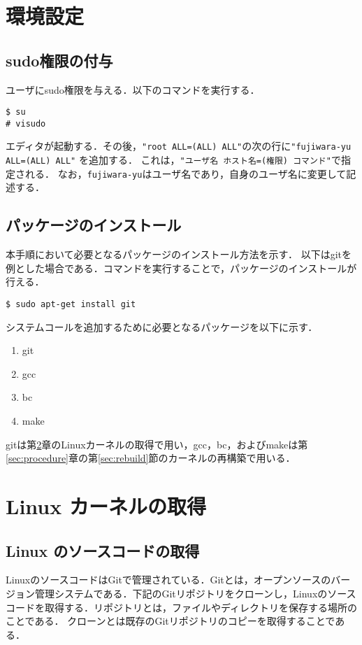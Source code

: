 \documentclass[12pt]{jsarticle}
\begin{document}
\section{環境設定}\label{sec:config}
\subsection{sudo権限の付与}
ユーザにsudo権限を与える．以下のコマンドを実行する．
\begin{verbatim}
$ su
# visudo
\end{verbatim}
エディタが起動する．その後，\verb|"root ALL=(ALL) ALL"|の次の行に\verb|"fujiwara-yu ALL=(ALL) ALL"| を追加する．
これは，\verb|"ユーザ名 ホスト名=(権限) コマンド"|で指定される．
なお，\verb|fujiwara-yu|はユーザ名であり，自身のユーザ名に変更して記述する．

\subsection{パッケージのインストール}
本手順において必要となるパッケージのインストール方法を示す．
以下はgitを例とした場合である．コマンドを実行することで，パッケージのインストールが行える．
\begin{verbatim}
$ sudo apt-get install git
\end{verbatim}
システムコールを追加するために必要となるパッケージを以下に示す．
\begin{enumerate}
\item git
\item gcc
\item bc
\item make
\end{enumerate}

gitは第\ref{sec:kernel}章のLinuxカーネルの取得で用い，gcc，bc，およびmakeは第\ref{sec:procedure}章の第\ref{sec:rebuild}節のカーネルの再構築で用いる．

\section{Linux カーネルの取得}\label{sec:kernel}
\subsection{Linux のソースコードの取得}
LinuxのソースコードはGitで管理されている．Gitとは，オープンソースのバージョン管理システムである．下記のGitリポジトリをクローンし，Linuxのソースコードを取得する．リポジトリとは，ファイルやディレクトリを保存する場所のことである．
クローンとは既存のGitリポジトリのコピーを取得することである．
\end{document}
